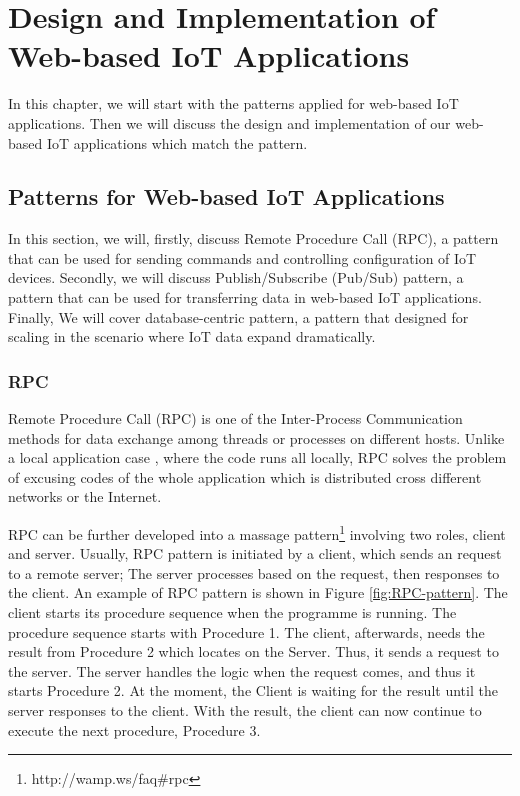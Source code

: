 \chapter{Design and Implementation of Web-based IoT Applications}
\label{chapter:Design-and-Implementation-of-Web-based-IoT-Applications}

In this chapter, we will start with the patterns applied for web-based IoT applications. Then we will discuss the design and implementation of our web-based IoT applications which match the pattern.

\section{Patterns for Web-based IoT Applications}
\label{chapter:Patternsforweb-basedIoTapplications}

In this section, we will, firstly, discuss Remote Procedure Call (RPC), a pattern that can be used for sending commands and controlling configuration of IoT devices. Secondly, we will discuss Publish/Subscribe (Pub/Sub) pattern, a pattern that can be used for transferring data in web-based IoT applications. Finally, We will cover database-centric pattern, a pattern that designed for scaling in the scenario where IoT data expand dramatically.

\subsection{RPC}
Remote Procedure Call (RPC) is one of the Inter-Process Communication methods for data exchange among threads or processes on different hosts. Unlike a local application case \cite{srinivasan1995rpc}, where the code runs all locally, RPC solves the problem of excusing codes of the whole application which is distributed cross different networks or the Internet.

RPC can be further developed into a massage pattern\footnote{http://wamp.ws/faq\#rpc} involving two roles, client and server. Usually, RPC pattern is initiated by a client, which sends an request to a remote server; The server processes based on the request, then responses to the client. An example of RPC pattern is shown in Figure \ref{fig:RPC-pattern}. The client starts its procedure sequence when the programme is running. The procedure sequence starts with Procedure 1. The client, afterwards, needs the result from Procedure 2 which locates on the Server. Thus, it sends a request to the server. The server handles the logic when the request comes, and thus it starts Procedure 2. At the moment, the Client is waiting for the result until the server responses to the client. With the result, the client can now continue to execute the next procedure, Procedure 3.  

